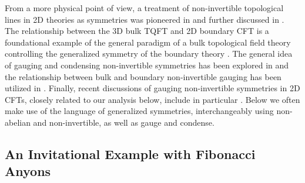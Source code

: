 \documentclass[11pt]{article}
\numberwithin{equation}{section}
\begin{document}
From a more physical point of view, a treatment of non-invertible topological lines in 2D theories as symmetries was pioneered in \cite{Chang:2018iay, Thorngren:2019iar,Thorngren:2021yso} and further discussed in \cite{Huang:2021zvu, Lin:2022dhv}.  The relationship between the 3D bulk TQFT and 2D boundary CFT is a foundational example of the general paradigm of a bulk topological field theory controlling the generalized symmetry of the boundary theory \cite{Gaiotto:2014kfa, Gaiotto:2020iye, Freed:2022qnc, Kaidi:2022cpf, Freed:2022iao, Bhardwaj:2023ayw}. The general idea of gauging and condensing non-invertible symmetries has been explored in \cite{Bhardwaj:2017xup, Gaiotto:2019xmp, Kaidi:2021gbs, Roumpedakis:2022aik, Choi:2023xjw, Perez-Lona:2023djo} and the relationship between bulk and boundary non-invertible gauging has been utilized in \cite{Kaidi:2023maf, Zhang:2023wlu, Cordova:2023bja,Antinucci:2023ezl, Bhardwaj:2023idu, Bhardwaj:2023fca}.  Finally, recent discussions of gauging non-invertible symmetries in 2D CFTs, closely related to our analysis below, include in particular \cite{Choi:2023vgk, Diatlyk:2023fwf}.  Below we often make use of the language of generalized symmetries, interchangeably using non-abelian and non-invertible, as well as gauge and condense.


\subsection{An Invitational Example with Fibonacci Anyons}\label{sec:introG2}
\end{document}
